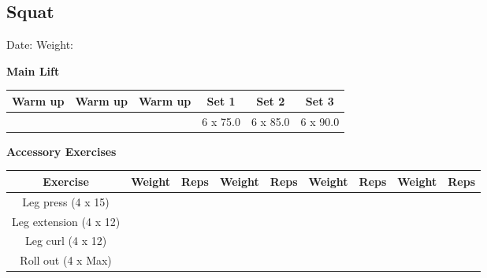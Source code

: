 \documentclass{article}%
\begin{document}
\subsection*{Squat}%
Date: %
\linebreak%
Weight: %
\vspace*{20pt}%
\linebreak%
\begin{minipage}{0.5\textwidth}%
\textbf{Main Lift\newline%
\newline%
}%
\begin{tabular}{|c|c|c|c|c|c|}%
\hline%
Warm up&Warm up&Warm up&Set 1&Set 2&Set 3\\%
\hline%
&&&6 x 75.0&6 x 85.0&6 x 90.0\\%
\hline%
\end{tabular}%
\vspace*{20pt}%
\linebreak%
\textbf{Accessory Exercises\newline%
\newline%
}%
\begin{tabular}{|c|c|c|c|c|c|c|c|c|}%
\hline%
Exercise&Weight&Reps&Weight&Reps&Weight&Reps&Weight&Reps\\%
\hline%
Leg press (4 x 15)&&&&&&&&\\%
\hline%
Leg extension (4 x 12)&&&&&&&&\\%
\hline%
Leg curl (4 x 12)&&&&&&&&\\%
\hline%
Roll out (4 x Max)&&&&&&&&\\%
\hline%
\end{tabular}%
\end{minipage}%
\vspace*{20pt}%
\linebreak

%
\end{document}
